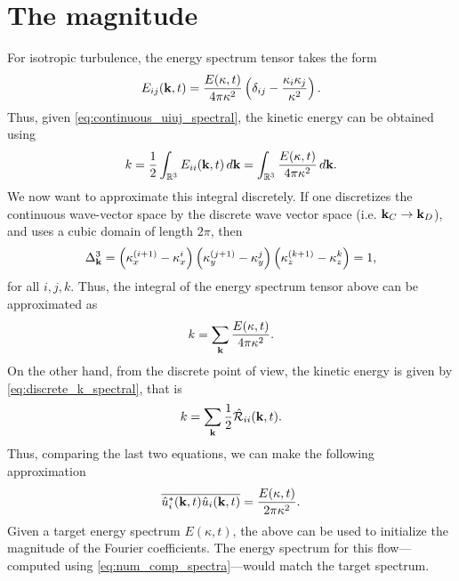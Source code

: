 \documentclass[oneside,a4paper,11pt]{report}
\newcommand{\tpvc}{\mathcal{R}} %
\newcommand{\est}{E}            %
\begin{document}
\section{The magnitude}
For isotropic turbulence, the energy spectrum tensor takes the form
\begin{equation}
    \est_{ij}(\kvec,t) = \frac{\est(\kappa,t)}{4 \pi \kappa^2} \left ( \delta_{ij} - \frac{\kappa_i \kappa_j}{\kappa^2} \right ).
\end{equation}
Thus, given \cref{eq:continuous_uiuj_spectral}, the kinetic energy can be obtained using
\begin{equation}
    k = \frac{1}{2} \int_\Rthree \est_{ii}(\kvec,t) \, d\kvec = \int_\Rthree \frac{\est(\kappa,t)}{4 \pi \kappa^2} \, d\kvec.
\end{equation}
We now want to approximate this integral discretely. If one discretizes the continuous wave-vector space by the discrete wave vector space (i.e. $\mathbf{k}_C \to \mathbf{k}_D$), and uses a cubic domain of length $2 \pi$, then 
\begin{equation}
    \Delta^3_{\mathbf{k}} = \left ( \kappa_x^{(i+1)} - \kappa_x^{i} \right ) \left ( \kappa_y^{(j+1)} - \kappa_y^{j} \right ) \left ( \kappa_z^{(k+1)} - \kappa_z^{k} \right ) = 1,
\end{equation}
for all $i,j,k$. Thus, the integral of the energy spectrum tensor above can be approximated as
\begin{equation}
    k = \sum_{\kvec} \frac{\est(\kappa,t)}{4 \pi \kappa^2}.
\end{equation}
On the other hand, from the discrete point of view, the kinetic energy is given by \cref{eq:discrete_k_spectral}, that is
\begin{equation}
    k = \sum_{\kvec} \frac{1}{2} \hat{\tpvc}_{ii}(\kvec,t).
\end{equation}
Thus, comparing the last two equations, we can make the following approximation
\begin{equation}
    \overline{ \hat{u}_i^*(\kvec,t) \hat{u}_i(\kvec,t)} = \frac{\est(\kappa,t)}{2 \pi \kappa^2}.
\end{equation}
Given a target energy spectrum $E(\kappa,t)$, the above can be used to initialize the magnitude of the Fourier coefficients. The energy spectrum for this flow---computed using \cref{eq:num_comp_spectra}---would match the target spectrum. 
\end{document}
